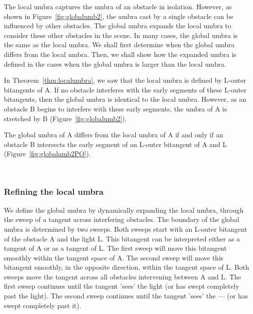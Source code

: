 \documentclass[12pt]{article}
\begin{document}
The local umbra captures the umbra of an obstacle in isolation.
However, as shown in Figure~\ref{fig:globalumb2}, 
the umbra cast by a single obstacle can be influenced by other obstacles.
The global umbra expands the local umbra to consider these other obstacles
in the scene.
In many cases, the global umbra is the same as the local umbra.
We shall first determine when the global umbra differs from the local umbra.
Then, we shall show how the expanded umbra is defined in the cases when
the global umbra is larger than the local umbra.

In Theorem~\ref{thm:localumbra}, we saw that
the local umbra is defined by L-outer bitangents of A.
If no obstacle interferes with the early segments of these L-outer bitangents,
then the global umbra is identical to the local umbra.
However, as an obstacle B begins to interfere with these early segments,
the umbra of A is stretched by B (Figure~\ref{fig:globalumb2}).

\begin{lemma}
The global umbra of A differs from the local umbra of A
if and only if an obstacle B intersects the early segment of an L-outer bitangent of 
A and L (Figure~\ref{fig:globalumb2PO}).
\end{lemma}
\prf
\ \ 
\QED


\subsubsection{Refining the local umbra}

We define the global umbra by dynamically expanding the local umbra,
through the sweep of a tangent across interfering obstacles.
The boundary of the global umbra is determined by two sweeps.
Both sweeps start with an L-outer bitangent of the obstacle A and the light L.
This bitangent can be interpreted either as a tangent of A
or as a tangent of L.
The first sweep will move this bitangent smoothly within the tangent space
of A.
The second sweep will move this bitangent smoothly, in the opposite direction,
within the tangent space of L.
Both sweeps move the tangent across all obstacles intervening between A and L.
The first sweep continues until the tangent 'sees' the light (or has swept
completely past the light).
The second sweep continues until the tangent 'sees' the --- (or has swept
completely past it).
\end{document}
